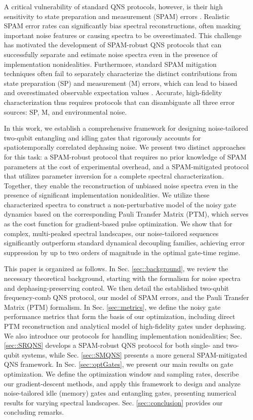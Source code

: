\documentclass[%
 reprint,
superscriptaddress,
 amsmath,amssymb,
 aps,
pra,
floatfix,
]{revtex4-2}
\newcommand{\qk}[1]{{\color{OliveGreen}#1}}
\begin{document}
A critical vulnerability of standard QNS protocols, however, is their high sensitivity to state preparation and measurement (SPAM) errors \cite{PhysRevApplied.22.024074}. Realistic SPAM error rates can significantly bias spectral reconstructions, often masking important noise features or causing spectra to be overestimated. This challenge has motivated the development of SPAM-robust QNS protocols that can successfully separate and estimate noise spectra even in the presence of implementation nonidealities. Furthermore, standard SPAM mitigation techniques often fail to separately characterize the distinct contributions from state preparation (SP) and measurement (M) errors, which can lead to biased and overestimated observable expectation values \cite{khan2025}. Accurate, high-fidelity characterization thus requires protocols that can disambiguate all three error sources: SP, M, and environmental noise.

In this work, we establish a comprehensive framework for designing noise-tailored two-qubit entangling and idling gates that rigorously accounts for spatiotemporally correlated dephasing noise. \qk{We present two distinct approaches for this task: a SPAM-robust protocol that requires no prior knowledge of SPAM parameters at the cost of experimental overhead, and a SPAM-mitigated protocol that utilizes parameter inversion for a complete spectral characterization. Together, they enable the reconstruction of unbiased noise spectra even in the presence of significant implementation nonidealities.} We utilize these characterized spectra to construct a non-perturbative model of the noisy gate dynamics based on the corresponding Pauli Transfer Matrix (PTM), which serves as the cost function for gradient-based pulse optimization. We show that for complex, multi-peaked spectral landscapes, our noise-tailored sequences significantly outperform standard dynamical decoupling families, achieving error suppression by up to two orders of magnitude in the optimal gate-time regime.

This paper is organized as follows. In Sec. \ref{sec::background}, we review the necessary theoretical background, starting with the formalism for noise spectra and dephasing-preserving control. We then detail the established two-qubit frequency-comb QNS protocol, our model of SPAM errors, and the Pauli Transfer Matrix (PTM) formalism. In Sec. \ref{sec::metrics}, we define the noisy gate performance metrics that form the basis of our optimization, including direct PTM reconstruction and analytical model of high-fidelity gates under dephasing. We also introduce our protocols for handling implementation nonidealities; Sec. \ref{sec::SRQNS} develops a SPAM-robust QNS protocol for both single- and two-qubit systems, while Sec. \ref{sec::SMQNS} presents a more general SPAM-mitigated QNS framework. In Sec. \ref{sec::optGates}, we present our main results on gate optimization. We define the optimization window and sampling rates, describe our gradient-descent methods, and apply this framework to design and analyze noise-tailored idle (memory) gates and entangling gates, presenting numerical results for varying spectral landscapes. Sec. \ref{sec::conclusion} provides our concluding remarks.
\end{document}
